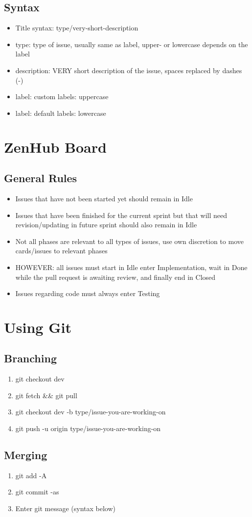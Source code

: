 \documentclass{article}
\begin{document}
		\subsection{Syntax}
			\begin{itemize}
				\item Title syntax: type/very-short-description
				\item type: type of issue, usually same as label, upper- or lowercase depends on the label
				\item description: VERY short description of the issue, spaces replaced by dashes (-)
				\item label: custom labels: uppercase
				\item label: default labels: lowercase
			\end{itemize}
			
	\section{ZenHub Board}
		\subsection{General Rules}
			\begin{itemize}
				\item Issues that have not been started yet should remain in Idle
				\item Issues that have been finished for the current sprint but that will need revision/updating in future sprint should also remain in Idle
				\item Not all phases are relevant to all types of issues, use own discretion to move cards/issues to relevant phases
				\item HOWEVER: all issues must start in Idle enter Implementation, wait in Done while the pull request is awaiting review, and finally end in Closed
				\item Issues regarding code must always enter Testing
			\end{itemize}
			
	\section{Using Git}
		\subsection{Branching}
			\begin{enumerate}
				\item git checkout dev
				\item git fetch && git pull
				\item git checkout dev -b type/issue-you-are-working-on
				\item git push -u origin type/issue-you-are-working-on
			\end{enumerate}
		\subsection{Merging}
			\begin{enumerate}
				\item git add -A
				\item git commit -as
				\item Enter git message (syntax below)
				
			\end{enumerate}
\end{document}
